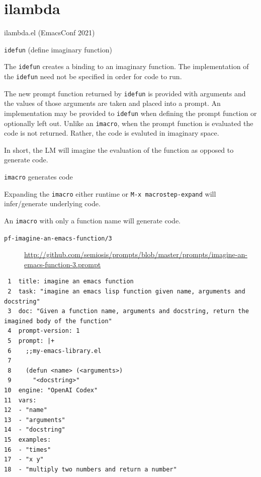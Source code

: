 \documentclass[presentation]{beamer}
\begin{document}
\section{ilambda}
\label{sec:orge3a6aa8}
\begin{frame}[label={sec:org3d2ff35},fragile]{ilambda.el (EmacsConf 2021)}
 \begin{block}{\texttt{idefun} (define imaginary function)}
{\tiny
The \texttt{idefun} creates a binding to an imaginary
function. The implementation of the \texttt{idefun}
need not be specified in order for code to
run.

The new prompt function returned by \texttt{idefun} is provided with arguments and the
values of those arguments are taken and placed
into a prompt. An implementation may be
provided to \texttt{idefun} when defining the prompt function or optionally left out.
Unlike an \texttt{imacro}, when the prompt function
is evaluated the code is not returned. Rather,
the code is evaluted in imaginary space.

In short, the LM will imagine the evaluation
of the function as opposed to generate code.
}
\end{block}


\begin{block}{\texttt{imacro} generates code}
{\tiny
Expanding the \texttt{imacro} either runtime or 
\texttt{M-x macrostep-expand}
will infer/generate underlying code.

An \texttt{imacro} with only a function name will generate code.
}

\begin{description}
\item[{\texttt{pf-imagine-an-emacs-function/3}}] \url{http://github.com/semiosis/prompts/blob/master/prompts/imagine-an-emacs-function-3.prompt}
\end{description}

\begin{verbatim}
 1  title: imagine an emacs function
 2  task: "imagine an emacs lisp function given name, arguments and docstring"
 3  doc: "Given a function name, arguments and docstring, return the imagined body of the function"
 4  prompt-version: 1
 5  prompt: |+
 6    ;;my-emacs-library.el
 7  
 8    (defun <name> (<arguments>)
 9      "<docstring>"
10  engine: "OpenAI Codex"
11  vars:
12  - "name"
13  - "arguments"
14  - "docstring"
15  examples:
16  - "times"
17  - "x y"
18  - "multiply two numbers and return a number"
\end{verbatim}


\end{block}
\end{frame}
\end{document}
